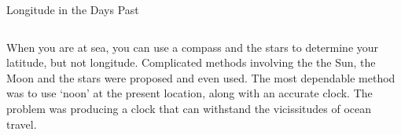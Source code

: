 \begin{myFrame}{Longitude in the Days Past}{}
	
	\begin{columns}
		
		\setCol
		\begin{itemize} 
			\col When you are at sea, you can use a compass and the stars to determine your latitude, but not longitude.
			\col Complicated methods involving the the Sun, the Moon and the stars were proposed and even used.
			\col The most dependable method was to use `noon' at the present location, along with an accurate clock.
			\col The problem was producing a clock that can withstand the vicissitudes of ocean travel.
		\end{itemize}
		
	\end{columns}
	
\end{myFrame}




